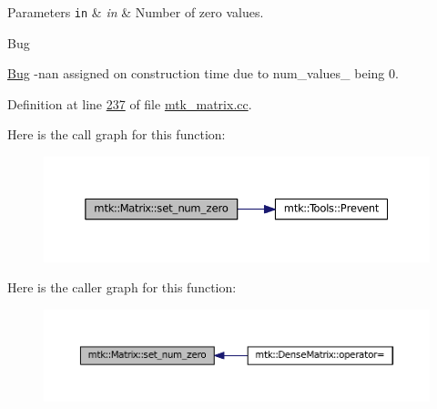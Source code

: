 \begin{DoxyParams}[1]{Parameters}
\mbox{\tt in}  & {\em in} & Number of zero values. \\
\hline
\end{DoxyParams}
\begin{DoxyRefDesc}{Bug}
\item[\hyperlink{bug__bug000001}{Bug}]-\/nan assigned on construction time due to num\+\_\+values\+\_\+ being 0. \end{DoxyRefDesc}


Definition at line \hyperlink{mtk__matrix_8cc_source_l00237}{237} of file \hyperlink{mtk__matrix_8cc_source}{mtk\+\_\+matrix.\+cc}.



Here is the call graph for this function\+:\nopagebreak
\begin{figure}[H]
\begin{center}
\leavevmode
\includegraphics[width=350pt]{classmtk_1_1Matrix_a6eb14709692df59573548ffd8cf67198_cgraph}
\end{center}
\end{figure}




Here is the caller graph for this function\+:\nopagebreak
\begin{figure}[H]
\begin{center}
\leavevmode
\includegraphics[width=350pt]{classmtk_1_1Matrix_a6eb14709692df59573548ffd8cf67198_icgraph}
\end{center}
\end{figure}


